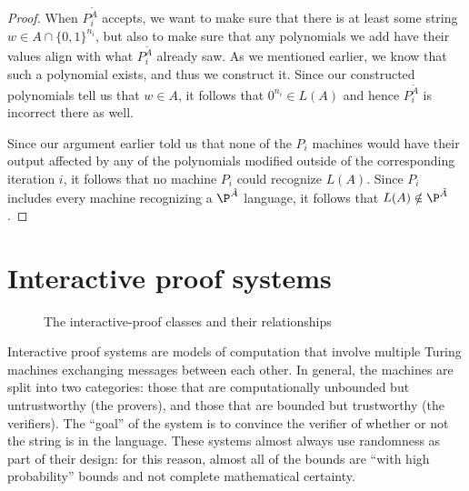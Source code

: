 \documentclass[english,12pt]{reedthesis}
\theoremstyle{plain}
\theoremstyle{definition}
\theoremstyle{remark}
\begin{document}
\begin{proof}
  When $P_{i}^{\tilde{A}}$ accepts, we want to make sure that there is at least
  some string $w \in A \cap \{0, 1\}^{n_{i}}$, but also to make sure that any
  polynomials we add have their values align with what $P_{i}^{\tilde{A}}$
  already saw. As we mentioned earlier, we know that such a polynomial exists,
  and thus we construct it. Since our constructed polynomials tell us that
  $w \in A$, it follows that $0^{n_{i}} \in L(A)$ and hence $P_{i}^{\tilde{A}}$ is
  incorrect there as well.

  Since our argument earlier told us that none of the $P_{i}$ machines would
  have their output affected by any of the polynomials modified outside of the
  corresponding iteration $i$, it follows that no machine $P_{i}$ could
  recognize $L(A)$. Since $P_{i}$ includes every machine recognizing a
  $\P^{\tilde{A}}$ language, it follows that $L(A) \notin \P^{\tilde{A}}$.
\end{proof}

\chapter{Interactive proof systems}\label{chap:ips}

\begin{figure}[htbp]
  \centering
  \caption{The interactive-proof classes and their
    relationships}\label{fig:ip-class-venn}
\end{figure}

Interactive proof systems are models of computation that involve multiple Turing
machines exchanging messages between each other. In general, the machines are
split into two categories: those that are computationally unbounded but
untrustworthy (the provers), and those that are bounded but trustworthy (the
verifiers). The ``goal'' of the system is to convince the verifier of whether or
not the string is in the language. These systems almost always use randomness as
part of their design: for this reason, almost all of the bounds are ``with high
probability'' bounds and not complete mathematical certainty.
\end{document}
